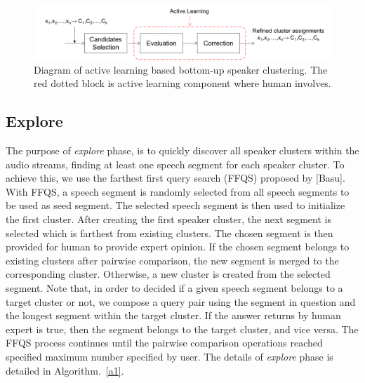 \documentclass[journal]{IEEEtran}
\begin{document}
\begin{figure}
	\centering
	\includegraphics[width=\linewidth]{figs/flow6}
	\caption{Diagram of active learning based bottom-up speaker clustering. The red dotted block is active learning component where human involves.}
	\label{fig:flow2}
\end{figure}

\subsection{Explore}
The purpose of \textit{explore} phase, is to quickly discover all speaker clusters within the audio streams, finding at least one speech segment for each speaker cluster. To achieve this, we use the farthest first query search (FFQS) proposed by [Basu]. With FFQS, a speech segment is randomly selected from all speech segments to be used as seed segment. The selected speech segment is then used to initialize the first cluster. After creating the first speaker cluster, the next segment is selected which is farthest from existing clusters. The chosen segment is then provided for human to provide expert opinion. If the chosen segment belongs to existing clusters after pairwise comparison, the new segment is merged to the corresponding cluster. Otherwise, a new cluster is created from the selected segment. Note that, in order to decided if a given speech segment belongs to a target cluster or not, we compose a query pair using the segment in question and the longest segment within the target cluster. If the answer returns by human expert is true, then the segment belongs to the target cluster, and vice versa. The FFQS process continues until the pairwise comparison operations reached specified maximum number specified by user. The details of \textit{explore} phase is detailed in Algorithm.~\ref{a1}.  
\end{document}
